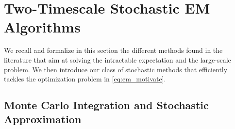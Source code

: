 \documentclass[journal, 11pt]{IEEEtran}
\begin{document}
\section{Two-Timescale Stochastic EM Algorithms}\label{sec:tts}


We recall and formalize in this section the different methods found in the literature that aim at solving the intractable expectation and the large-scale problem. 
We then introduce our class of stochastic methods that efficiently tackles the optimization problem in \eqref{eq:em_motivate}.


\subsection{Monte Carlo Integration and Stochastic Approximation} 
\end{document}
